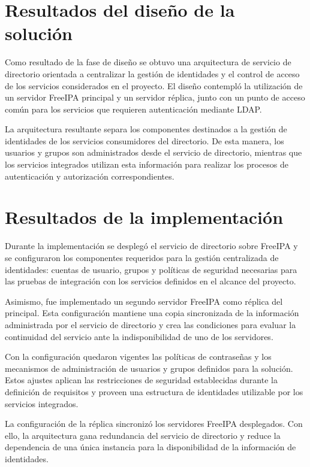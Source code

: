 \section{Resultados del diseño de la solución}
\label{sec:resultados-diseno}

Como resultado de la fase de diseño se obtuvo una arquitectura de servicio de directorio orientada a centralizar la gestión de identidades y el control de acceso de los servicios considerados en el proyecto. El diseño contempló la utilización de un servidor FreeIPA principal y un servidor réplica, junto con un punto de acceso común para los servicios que requieren autenticación mediante LDAP.

La arquitectura resultante separa los componentes destinados a la gestión de identidades de los servicios consumidores del directorio. De esta manera, los usuarios y grupos son administrados desde el servicio de directorio, mientras que los servicios integrados utilizan esta información para realizar los procesos de autenticación y autorización correspondientes.

\section{Resultados de la implementación}
\label{sec:resultados-implementacion}

Durante la implementación se desplegó el servicio de directorio sobre FreeIPA y se configuraron los componentes requeridos para la gestión centralizada de identidades: cuentas de usuario, grupos y políticas de seguridad necesarias para las pruebas de integración con los servicios definidos en el alcance del proyecto.

Asimismo, fue implementado un segundo servidor FreeIPA como réplica del principal. Esta configuración mantiene una copia sincronizada de la información administrada por el servicio de directorio y crea las condiciones para evaluar la continuidad del servicio ante la indisponibilidad de uno de los servidores.

Con la configuración quedaron vigentes las políticas de contraseñas y los mecanismos de administración de usuarios y grupos definidos para la solución. Estos ajustes aplican las restricciones de seguridad establecidas durante la definición de requisitos y proveen una estructura de identidades utilizable por los servicios integrados.

La configuración de la réplica sincronizó los servidores FreeIPA desplegados. Con ello, la arquitectura gana redundancia del servicio de directorio y reduce la dependencia de una única instancia para la disponibilidad de la información de identidades.

